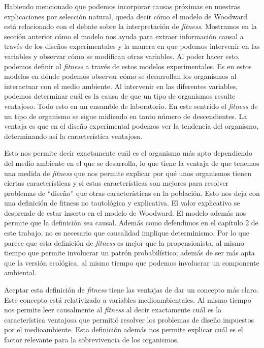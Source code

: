 Habiendo mencionado que podemos incorporar causas próximas en nuestras explicaciones por selección natural, queda decir cómo el modelo de Woodward está relacionado con el debate sobre la interpretación de \emph{fitness}. Mostramos en la sección anterior cómo el modelo nos ayuda para extraer información causal a través de los diseños experimentales y la manera en que podemos intervenir en las variables y observar cómo se modifican otras variables. Al poder hacer esto, podemos definir al \emph{fitness} a través de estos modelos experimentales. Es en estos modelos en dónde podemos observar cómo se desarrollan los organismos al interactuar con el medio ambiente. Al intervenir en las diferentes variables, podemos determinar cuál es la causa de que un tipo de organismos resulte ventajoso. Todo esto en un ensamble de laboratorio. En este sentrido el \emph{fitness} de un tipo de organismo se sigue midiendo en tanto número de descendientes. La ventaja es que en el diseño experimental podemos ver la tendencia del organismo, determinando así la característica ventajosa.

Esto nos permite decir exactamente cuál es el organismo más apto dependiendo del medio ambiente en el que se desarrolla, lo que tiene la ventaja de que tenemos una medida de \emph{fitness} que nos permite explicar por qué unos organismos tienen ciertas características y si estas características son mejores para resolver problemas de ``diseño'' que otras características en la población. Esto nos deja con una definición de fitness no tautológica y explicativa. El valor explicativo se desprende de estar inserto en el modelo de Woodward. El modelo además nos permite que la definición sea causal. Además como defendimos en el capítulo 2 de este trabajo, no es necesario que causalidad implique determinismo. Por lo que parece que esta definición de \emph{fitness} es mejor que la propensionista, al mismo tiempo que permite involucrar un patrón probabilístico; además de ser más apta que la versión ecológica, al mismo tiempo que podemos involucrar un componente ambiental.

Aceptar esta definición de \emph{fitness} tiene las ventajas de dar un concepto más claro. Este concepto está relativizado a variables medioambientales. Al mismo tiempo nos permite leer causalmente al \emph{fitness} al decir exactamente cuál es la característica ventajosa que permitió resolver los problemas de diseño impuestos por el medioambiente. Esta definición además nos permite explicar cuál es el factor relevante para la sobrevivencia de los organismos.

